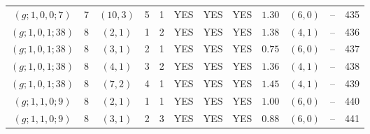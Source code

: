 \begin{longtable}{|c|c|c|c|c|c|c|c|c|c|c|c|}
$(g;1,0,0;7)$ & 7 & $(10,3)$ & 5 & 1 & YES & YES & YES & $1.30$ & $(6,0)$ & -- & 435\\
$(g;1,0,1;38)$ & 8 & $(2,1)$ & 1 & 2 & YES & YES & YES & $1.38$ & $(4,1)$ & -- & 436\\
$(g;1,0,1;38)$ & 8 & $(3,1)$ & 2 & 1 & YES & YES & YES & $0.75$ & $(6,0)$ & -- & 437\\
$(g;1,0,1;38)$ & 8 & $(4,1)$ & 3 & 2 & YES & YES & YES & $1.36$ & $(4,1)$ & -- & 438\\
$(g;1,0,1;38)$ & 8 & $(7,2)$ & 4 & 1 & YES & YES & YES & $1.45$ & $(4,1)$ & -- & 439\\
$(g;1,1,0;9)$ & 8 & $(2,1)$ & 1 & 1 & YES & YES & YES & $1.00$ & $(6,0)$ & -- & 440\\
$(g;1,1,0;9)$ & 8 & $(3,1)$ & 2 & 3 & YES & YES & YES & $0.88$ & $(6,0)$ & -- & 441
\end{longtable}
